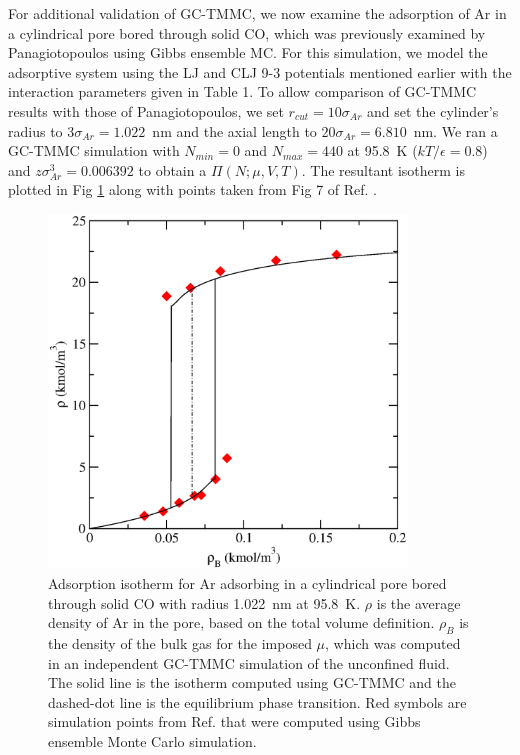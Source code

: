For additional validation of GC-TMMC, we now examine the adsorption of Ar in a cylindrical pore bored through solid CO, which was previously examined by  Panagiotopoulos\cite{Panagiotopoulos_Adsorption_1987} using Gibbs ensemble MC. For this simulation, we model the adsorptive system using the LJ and CLJ 9-3 potentials mentioned earlier with the interaction parameters given in Table 1. To allow comparison of GC-TMMC results with those of Panagiotopoulos, we set $r_{cut} = 10\sigma_{Ar}$ and set the cylinder's radius to $3\sigma_{Ar} = 1.022$~nm and the axial length to $20\sigma_{Ar} = 6.810$~nm. We ran a GC-TMMC simulation with $N_{min}=0$ and $N_{max}=440$ at 95.8~K ($kT/\epsilon=0.8$) and $z\sigma_{Ar}^3 = 0.006392$ to obtain a $\Pi\left(N;\mu,V,T\right)$. The resultant isotherm is plotted in Fig \ref{clj93_azp_isotherm} along with points taken from Fig 7 of Ref. .
%
\begin{figure}
 \includegraphics[clip=true,width=0.85\textwidth]{Figures/r_3sigma_tube93}
  \caption{Adsorption isotherm for Ar adsorbing in a cylindrical pore bored through solid CO with radius 1.022~nm at 95.8~K. $\rho$ is the average density of Ar in the pore, based on the total volume definition. $\rho_B$ is the density of the bulk gas for the imposed $\mu$, which was computed in an independent GC-TMMC simulation of the unconfined fluid\cite{NIST_SRSW}. The solid line is the isotherm computed using GC-TMMC and the dashed-dot line is the equilibrium phase transition. Red symbols are simulation points from Ref.  that were computed using Gibbs ensemble Monte Carlo simulation.}
  \label{clj93_azp_isotherm}
\end{figure}
